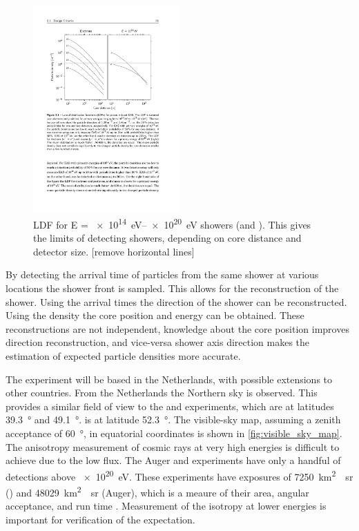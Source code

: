 \begin{figure}
    \centering
    \includegraphics[width=0.5\textwidth]
                    {plots/cosmic-rays/ldf_energies}
    \caption{LDF for E = \SIrange{e14}{e20}{\eV} showers (\Pmuon and \Pelectron). This gives the limits of detecting showers, depending on core distance and detector size. [remove horizontal lines]}
    \label{fig:ldf_energies}
\end{figure}

By detecting the arrival time of particles from the same shower at various locations the shower front is sampled. This allows for the reconstruction of the shower. Using the arrival times the direction of the shower can be reconstructed. Using the density the core position and energy can be obtained. These reconstructions are not independent, knowledge about the core position improves direction reconstruction, and vice-versa shower axis direction makes the estimation of expected particle densities more accurate.

The experiment will be based in the Netherlands, with possible extensions to other countries. From the Netherlands the Northern sky is observed. This provides a similar field of view to the \ta and \kascade experiments, which are at latitudes \SI{39.3}{\degree} and \SI{49.1}{\degree}. \nikhef is at latitude \SI{52.3}{\degree}. The visible-sky map, assuming a zenith acceptance of \SI{60}{\degree}, in equatorial coordinates is shown in \cref{fig:visible_sky_map}. The anisotropy measurement of cosmic rays at very high energies is difficult to achieve due to the low flux. The Auger and \ta experiments have only a handful of detections above \SI{e20}{\eV}. These experiments have exposures of \SI{7250}{\kilo\meter\squared\year\steradian} (\ta) and \SI{48029}{\kilo\meter\squared\year\steradian} (Auger), which is a meaure of their area, angular acceptance, and run time \cite{abbasi2015combined}. Measurement of the isotropy at lower energies is important for verification of the expectation.

